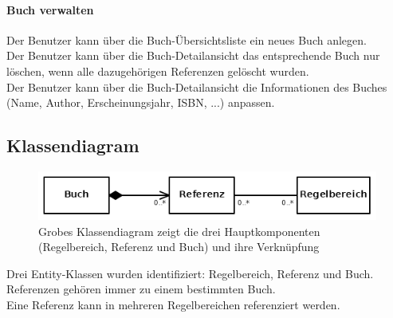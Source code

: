 \paragraph{Buch verwalten}
Der Benutzer kann über die Buch-Übersichtsliste ein neues Buch anlegen.\\
Der Benutzer kann über die Buch-Detailansicht das entsprechende Buch nur löschen, wenn alle dazugehörigen Referenzen gelöscht wurden.\\
Der Benutzer kann über die Buch-Detailansicht die Informationen des Buches (Name, Author, Erscheinungsjahr, ISBN, ...) anpassen.
\newpage
\subsection{Klassendiagram}
\begin{figure}
\includegraphics[width=\textwidth]{simpleclasses.png}
\caption{Grobes Klassendiagram zeigt die drei Hauptkomponenten (Regelbereich, Referenz und Buch) und ihre Verknüpfung}
\end{figure}
Drei Entity-Klassen wurden identifiziert: Regelbereich, Referenz und Buch.\\
Referenzen gehören immer zu einem bestimmten Buch.\\
Eine Referenz kann in mehreren Regelbereichen referenziert werden.